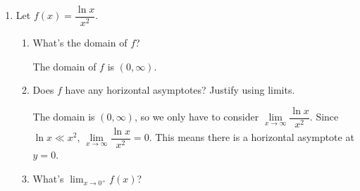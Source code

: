 \documentclass{article}
\begin{document}
\begin{enumerate}[resume]
\begin{enumerate}
  \item
    \begin{problem}[\vfill\newpage]
      $\displaystyle \lim_{x \to \infty} \dfrac{e^{2x} + x}{6e^{5x} + \log_5 x}$
    \end{problem}

    \begin{solution}
      As $x\to \infty$, the dominant terms in the numerator and denominator
      are $e^{2x}$ and $5e^{6x}$ respectively.
      \begin{align*}
        \lim_{x \to \infty} \frac{e^{2x} + x}{6e^{5x} + \log_5 x}  
        &= \lim_{x \to \infty} \frac{e^{2x}}{6e^{5x}} \\
        &= \lim_{x \to \infty} \frac{1}{6e^{3x}} \\
        &= 0
      \end{align*}
    \end{solution}

  \end{enumerate}

\item 
  Let $f(x) = \dfrac{\ln x}{x^2}$.

  \begin{enumerate}
  \item
    \begin{problem}[0.35in]
      What's the domain of $f$?
    \end{problem}

    \begin{solution}
      The domain of $f$ is $(0, \infty)$. 
    \end{solution}

  \item
    \begin{problem}[0.65in]
      Does $f$ have any horizontal asymptotes? Justify using limits. 
    \end{problem}

    \begin{solution}
      The domain is $(0, \infty)$, so we only have to 
      consider $\lim\limits_{x \to \infty} \dfrac{\ln x}{x^2}$.
      Since $\ln x \ll x^2$, $\lim\limits_{x \to \infty} \dfrac{\ln x}{x^2}=0$. This means there is a horizontal asymptote at $y=0$.
    \end{solution}

  \item
    \begin{problem}[0.65in]
      What's $\displaystyle \lim_{x \to 0^+} f(x)$? 
    \end{problem}


\end{enumerate}
\end{enumerate}
\end{document}
